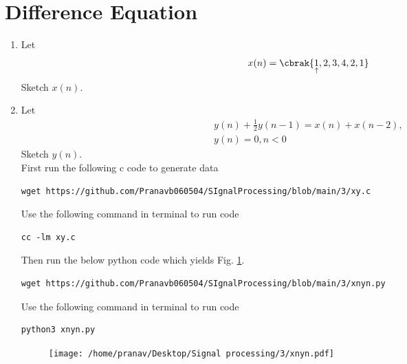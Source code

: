\documentclass[journal,12pt,twocolumn]{IEEEtran}
\renewcommand\thesection{\arabic{section}}
\begin{document}
\section{Difference Equation}
\begin{enumerate}[label=\thesection.\arabic*,ref=\thesection.\theenumi]
\item Let
\begin{equation}
x(n) = \cbrak{\underset{\uparrow}{1},2,3,4,2,1}
\end{equation}
Sketch $x(n)$.
\item Let
\begin{multline}
\label{eq:iir_filter}
y(n) + \frac{1}{2}y(n-1) = x(n) + x(n-2), 
\\
 y(n) = 0, n < 0
\end{multline}
Sketch $y(n)$.
\\
\solution
First run the following c code to generate data
\begin{lstlisting}
wget https://github.com/Pranavb060504/SIgnalProcessing/blob/main/3/xy.c
\end{lstlisting}
Use the following command in terminal to run code
\begin{lstlisting}
cc -lm xy.c
\end{lstlisting}
Then run the below python code which yields Fig. \ref{fig:xnyn}.
\begin{lstlisting}
wget https://github.com/Pranavb060504/SIgnalProcessing/blob/main/3/xnyn.py
\end{lstlisting}
Use the following command in terminal to run code
\begin{lstlisting}
python3 xnyn.py
\end{lstlisting}
\begin{figure}[!ht]
\begin{center}
\texttt{[image: /home/pranav/Desktop/Signal processing/3/xnyn.pdf]}
\end{center}
\label{fig:xnyn}	
\end{figure}

\end{enumerate}
\end{document}
